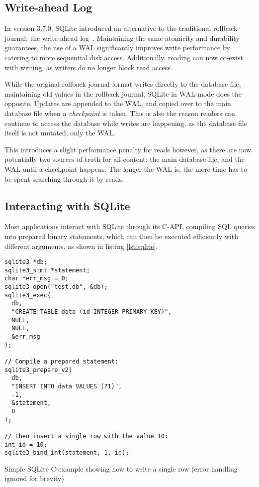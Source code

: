 \subsection{Write-ahead Log}
In version 3.7.0, SQLite introduced an alternative to the traditional rollback
journal: the write-ahead log~\cite{sqlite-wal}. Maintaining the same atomicity
and durability guarantees, the use of a WAL significantly improves write
performance by catering to more sequential disk access. Additionally, reading
can now co-exist with writing, as writers do no longer block read access.

While the original rollback journal format writes directly to the database file,
maintaining old values in the rollback journal, SQLite in WAL-mode does the
opposite. Updates are appended to the WAL, and copied over to the main database
file when a \textit{checkpoint} is taken. This is also the reason readers can
continue to access the database while writes are happening, as the database file
itself is not mutated, only the WAL.\@

This introduces a slight performance penalty for reads however, as there are now
potentially two sources of truth for all content: the main database file, and
the WAL until a checkpoint happens. The longer the WAL is, the more time has to
be spent searching through it by reads.

\subsection{Interacting with SQLite}
Most applications interact with SQLite through its C-API, compiling SQL
queries into prepared binary statements, which can then be executed efficiently
with different arguments, as shown in listing \ref{lst:sqlite}.

\begin{listing}[H]\label{lst:sqlite}
  \begin{verbatim}
sqlite3 *db;
sqlite3_stmt *statement;
char *err_msg = 0;
sqlite3_open("test.db", &db);
sqlite3_exec(
  db,
  "CREATE TABLE data (id INTEGER PRIMARY KEY)",
  NULL,
  NULL,
  &err_msg
);

// Compile a prepared statement:
sqlite3_prepare_v2(
  db,
  "INSERT INTO data VALUES (?1)",
  -1,
  &statement,
  0
);

// Then insert a single row with the value 10:
int id = 10;
sqlite3_bind_int(statement, 1, id);
  \end{verbatim}

  \caption{Simple SQLite C-example showing how to write a single row (error
  handling ignored for brevity)}
\end{listing}

